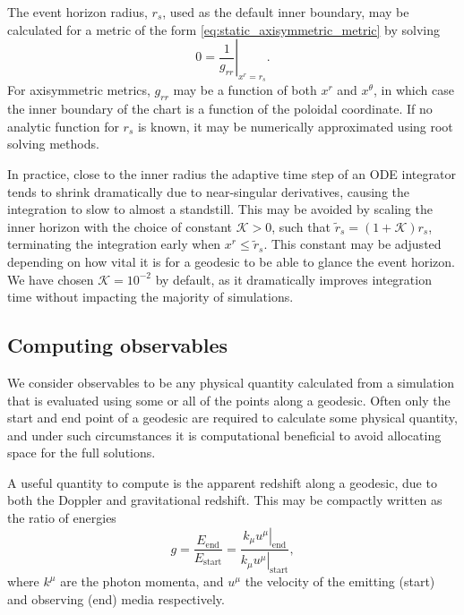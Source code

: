 The event horizon radius, $r_s$, used as the default inner boundary, may be calculated for a metric of the form \eqref{eq:static_axisymmetric_metric} by solving
\begin{equation}
    \label{eq:event_horizon}
    0 = \left. \frac{1}{g_{rr}} \right\rvert_{x^r = r_s}.
\end{equation}
For axisymmetric metrics, $g_{rr}$ may be a function of both $x^r$ and $x^\theta$, in which case the inner boundary of the chart is a function of the poloidal coordinate. If no analytic function for $r_s$ is known, it may be numerically approximated using root solving methods.

In practice, close to the inner radius the adaptive time step of an ODE integrator tends to shrink dramatically due to near-singular derivatives, causing the integration to slow to almost a standstill. This may be avoided by scaling the inner horizon with the choice of constant $\mathcal{K} > 0$, such that $\tilde{r}_s = (1 + \mathcal{K}) r_s$, terminating the integration early when $x^r \leq \tilde{r}_s$. This constant may be adjusted depending on how vital it is for a geodesic to be able to glance the event horizon. We have chosen $\mathcal{K} = 10^{-2}$ by default, as it dramatically improves integration time without impacting the majority of simulations.


\subsection{Computing observables}

We consider observables to be any physical quantity calculated from a simulation that is evaluated using some or all of the points along a geodesic. Often only the start and end point of a geodesic are required to calculate some physical quantity, and under such circumstances it is computational beneficial to avoid allocating space for the full solutions. 

A useful quantity to compute is the apparent redshift along a geodesic, due to both the Doppler and gravitational redshift. This may be compactly written as the ratio of energies
\begin{equation}
g = \frac{E_\text{end}}{E_\text{start}} = \frac{\left. k_\mu u^\mu \right\rvert_\text{end}}{\left. k_\mu u^\mu \right\rvert_{\text{start}}},
\end{equation}
where $k^\mu$ are the photon momenta, and $u^\mu$ the velocity of the emitting (start) and observing (end) media respectively.



